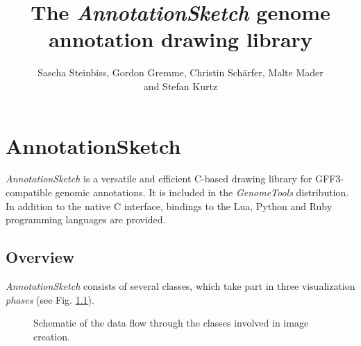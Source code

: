 \documentclass[a4paper]{scrreprt}
\title{The \emph{AnnotationSketch} genome annotation drawing library}
\author{Sascha Steinbiss, Gordon Gremme, Christin Sch\"arfer, Malte Mader\\ and Stefan Kurtz}
\begin{document}
\maketitle

\tableofcontents

\chapter{AnnotationSketch}

\emph{AnnotationSketch} is a versatile and efficient C-based drawing library for GFF3-compatible genomic annotations. It is included in the \emph{GenomeTools} distribution. In addition to the native C interface, bindings to the Lua, Python and Ruby programming languages are provided.

\section{Overview}
\emph{AnnotationSketch} consists of several classes, which take part in
three visualization \emph{phases} (see Fig. \ref{dataflow}).

\begin{figure}[ht]
\caption{Schematic of the data flow through the classes involved in image creation.}
\label{dataflow}
\end{figure}
\end{document}
